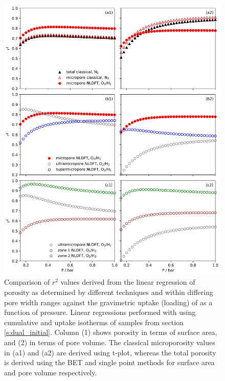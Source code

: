 \begin{figure}[hptb]
    \centering
    \includegraphics[width=\columnwidth, keepaspectratio]{6-pyPUC/figs/pyPUC_initial.png}
    \caption{Comparison of $r^2$ values derived from the linear regression of porosity as determined by different techniques and within differing pore width ranges against the gravimetric uptake (loading) of  as a function of pressure. Linear regressions performed with using cumulative  and  uptake isotherms of samples from section \ref{s:dual_initial}. Column (1) shows porosity in terms of surface area, and (2) in terms of pore volume. The classical microporosity values in (a1) and (a2) are derived using t-plot, whereas the total porosity is derived using the BET and  single point methods for surface area and pore volume respectively.}
    \label{fig:pyPUC_initial}
\end{figure}

